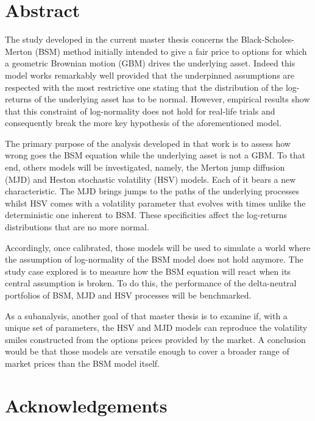 \documentclass[12pt]{report}
\begin{document}


\chapter*{Abstract}
 
The study developed in the current master thesis concerns the Black-Scholes-Merton (BSM) method initially intended to give a fair price to options for which a geometric Brownian motion (GBM) drives the underlying asset.
Indeed this model works remarkably well provided that the underpinned assumptions are respected with the most restrictive one stating that the distribution of the log-returns of the underlying asset has to be normal.
However, empirical results show that this constraint of log-normality does not hold for real-life trials and consequently break the more key hypothesis of the aforementioned model.

The primary purpose of the analysis developed in that work is to assess how wrong goes the BSM equation while the underlying asset is not a GBM.
To that end, others models will be investigated, namely, the Merton jump diffusion (MJD) and Heston stochastic volatility (HSV) models.
Each of it bears a new characteristic. The MJD brings jumps to the paths of the underlying processes whilst HSV comes with a volatility parameter that evolves with times unlike the deterministic one inherent to BSM. These specificities affect the log-returns distributions that are no more normal.

Accordingly, once calibrated, those models will be used to simulate a world where the assumption of log-normality of the BSM model does not hold anymore. The study case explored is to measure how the BSM equation will react when its central assumption is broken.
To do this, the performance of the delta-neutral portfolios of BSM, MJD and HSV processes will be benchmarked.

As a subanalysis, another goal of that master thesis is to examine if, with a unique set of parameters, the HSV and MJD models can reproduce the volatility smiles constructed from the options prices provided by the market.
A conclusion would be that those models are versatile enough to cover a broader range of market prices than the BSM model itself.
\chapter*{Acknowledgements}
\end{document}
